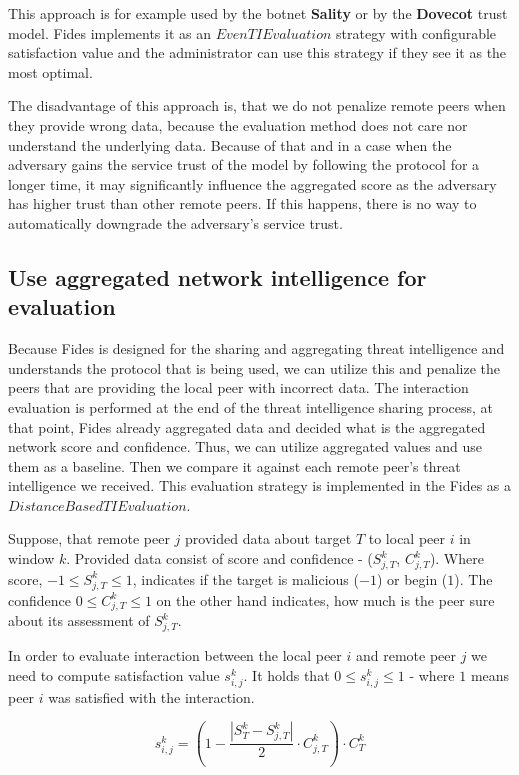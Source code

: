 This approach is for example used by the botnet \textbf{Sality} or by the \textbf{Dovecot} trust model. Fides implements it as an $EvenTIEvaluation$ strategy with configurable satisfaction value and the administrator can use this strategy if they see it as the most optimal.

The disadvantage of this approach is, that we do not penalize remote peers when they provide wrong data, because the evaluation method does not care nor understand the underlying data.
Because of that and in a case when the adversary gains the service trust of the model by following the protocol for a longer time, it may significantly influence the aggregated score as the adversary has higher trust than other remote peers. If this happens, there is no way to automatically downgrade the adversary's service trust.

\subsection{Use aggregated network intelligence for evaluation}
\label{subsec:distance-based-eval}
Because Fides is designed for the sharing and aggregating threat intelligence and understands the protocol that is being used, we can utilize this and penalize the peers that are providing the local peer with incorrect data.
The interaction evaluation is performed at the end of the threat intelligence sharing process, at that point, Fides already aggregated data and decided what is the aggregated network score and confidence. 
Thus, we can utilize aggregated values and use them as a baseline. Then we compare it against each remote peer's threat intelligence we received. This evaluation strategy is implemented in the Fides as a $DistanceBasedTIEvaluation$.

Suppose, that remote peer $j$ provided data about target $T$ to local peer $i$ in window $k$. Provided data consist of score and confidence - ($S^{k}_{j, T}$, $C^{k}_{j, T}$). Where score,  $-1 \leq S^{k}_{j, T} \leq 1$, indicates if the target is malicious ($-1$) or begin ($1$). The confidence $0 \leq C^{k}_{j, T} \leq 1$ on the other hand indicates, how much is the peer sure about its assessment of $S^{k}_{j, T}$.

In order to evaluate interaction between the local peer $i$ and remote peer $j$ we need to compute satisfaction value $s^{k}_{i, j}$. 
It holds that  $0 \leq s^{k}_{i, j} \leq 1$ - where $1$ means peer $i$ was satisfied with the interaction.

\begin{equation}
s^{k}_{i, j} = \left(1 - \frac{|{S}^{k}_{T} - S^{k}_{j, T}|}{2} \cdot C^{k}_{j, T}\right) \cdot C^{k}_{T}
\end{equation}

